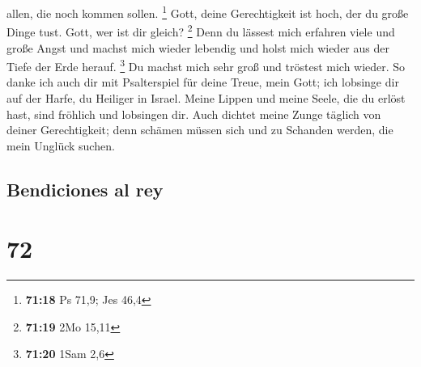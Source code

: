 allen, die noch kommen sollen. \footnote{\textbf{71:18} Ps 71,9; Jes
  46,4}  Gott, deine Gerechtigkeit ist hoch, der du große
Dinge tust. Gott, wer ist dir gleich? \footnote{\textbf{71:19} 2Mo 15,11}
 Denn du lässest mich erfahren viele und große Angst und
machst mich wieder lebendig und holst mich wieder aus der Tiefe der Erde
herauf. \footnote{\textbf{71:20} 1Sam 2,6}  Du machst
mich sehr groß und tröstest mich wieder.  So danke ich
auch dir mit Psalterspiel für deine Treue, mein Gott; ich lobsinge dir
auf der Harfe, du Heiliger in Israel.  Meine Lippen und
meine Seele, die du erlöst hast, sind fröhlich und lobsingen dir.
 Auch dichtet meine Zunge täglich von deiner
Gerechtigkeit; denn schämen müssen sich und zu Schanden werden, die mein
Unglück suchen.

\hypertarget{bendiciones-al-rey}{%
\subsection{Bendiciones al rey}\label{bendiciones-al-rey}}

\hypertarget{section-71}{%
\section{72}\label{section-71}}

